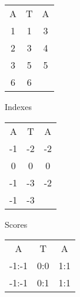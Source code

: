 \documentclass[thesis.tex]{subfiles}
\begin{document}
\begin{wraptable}{l}{0.5\textwidth}
  \begin{mdframed}
    \begin{subfigure}[t]{0.49\textwidth}
      \begin{center}
        \begin{tabularx}{\textwidth}{ccc}
          A & T & A \\ \cline{1-3}
          \multicolumn{1}{|c|}{1} & 1 & \multicolumn{1}{|c|}{3} \\ \cline{1-3}
          \multicolumn{1}{|c|}{2} & 3 & \multicolumn{1}{|c|}{4} \\ \cline{1-3}
          \multicolumn{1}{|c|}{3} & 5 & \multicolumn{1}{|c|}{5} \\ \cline{1-3}
          \multicolumn{1}{|c|}{6} & 6 & \multicolumn{1}{|c}{ }  \\ \cline{1-2}
        \end{tabularx}
        \caption{Indexes}
      \end{center}
    \end{subfigure}
    \begin{subfigure}[t]{0.49\textwidth}
      \begin{center}
        \begin{tabularx}{\textwidth}{ccc}
          A & T & A \\ \cline{1-3}
          \multicolumn{1}{|c|}{-1} & -2 & \multicolumn{1}{|c|}{-2} \\ \cline{1-3}
          \multicolumn{1}{|c|}{0} & 0 & \multicolumn{1}{|c|}{0} \\ \cline{1-3}
          \multicolumn{1}{|c|}{-1} & -3 & \multicolumn{1}{|c|}{-2} \\ \cline{1-3}
          \multicolumn{1}{|c|}{-1} & -3 & \multicolumn{1}{|c}{ }  \\ \cline{1-2}
        \end{tabularx}
        \caption{Scores}
      \end{center}
    \end{subfigure}
    \begin{subfigure}[b]{\textwidth}
      \begin{center}
        \begin{tabularx}{\textwidth}{ccc}
          A & T & A \\ \cline{1-3}
          \multicolumn{1}{|c|}{-1:-1} & 0:0 & \multicolumn{1}{|c|}{1:1} \\ \cline{1-3}
          \multicolumn{1}{|c|}{-1:-1} & 0:1 & \multicolumn{1}{|c|}{1:1} \\ \cline{1-3}

\end{tabularx}
\end{center}
\end{subfigure}
\end{mdframed}
\end{wraptable}
\end{document}
